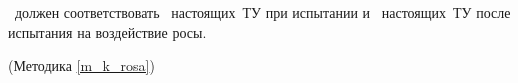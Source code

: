 \dut \ должен соответствовать \treb \ настоящих~ТУ при испытании и \trebafter \ настоящих~ТУ после испытания на воздействие росы.

\begin{flushright}
	(Методика \ref{m_k_rosa})
\end{flushright}